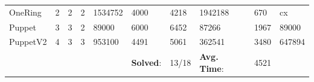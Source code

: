 \begin{table}[]
\begin{tabular}{|l|llll|llll|l|}
OneRing       & 2  & 2  & 2  & 1534752                      & 4000            & 4218           & 1942188      & 670        & cx       \\
Puppet        & 3  & 3  & 2  & 89000                        & 6000            & 6452           & 87266        & 1967       & 89000   \\
PuppetV2      & 4  & 3  & 3  & 953100                       & 4491            & 5061           & 362541       & 3480       & 647894  \\ \hline
\multicolumn{5}{|l|}{}     & \textbf{Solved}: & \multicolumn{1}{l}{13/18} & \textbf{Avg. Time}: & 4521  & \\ \hline       

\end{tabular}





\end{table}
